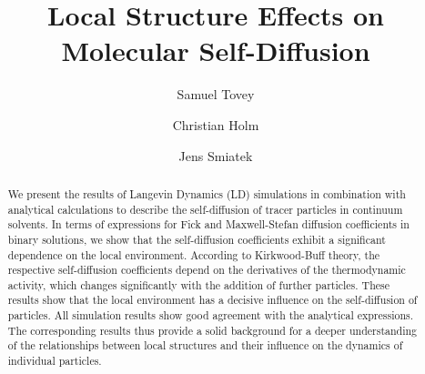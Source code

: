 \documentclass[aip,jcp,reprint]{revtex4-1}
\begin{document}
\title{Local Structure Effects on Molecular Self-Diffusion}
\author{Samuel Tovey}
\author{Christian Holm}
\author{Jens Smiatek}

\begin{abstract}
We present the results of Langevin Dynamics (LD) simulations in combination with analytical calculations to describe the self-diffusion of tracer particles in continuum solvents. In terms of expressions for Fick and Maxwell-Stefan diffusion coefficients in binary solutions, we show that the self-diffusion coefficients exhibit a significant dependence on the local environment. According to Kirkwood-Buff theory, the respective self-diffusion coefficients depend on the derivatives of the thermodynamic activity, which changes significantly with the addition of further particles. These results show that the local environment has a decisive influence on the self-diffusion of particles. All simulation results show good agreement with the analytical expressions. The corresponding results thus provide a solid background for a deeper understanding of the relationships between local structures and their influence on the dynamics of individual particles.
\end{abstract}

\maketitle


\end{document}
